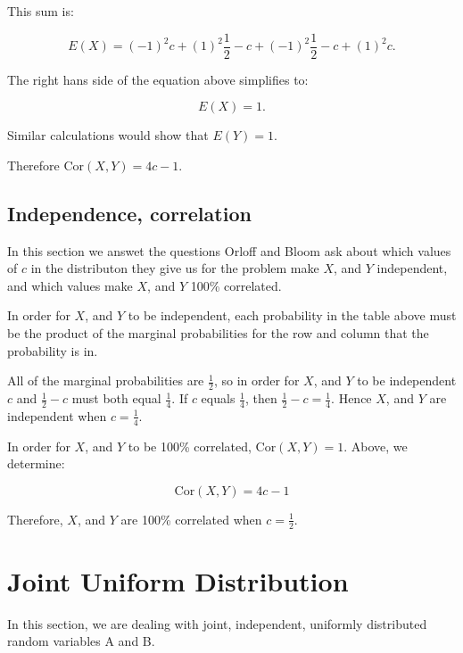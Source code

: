 \documentclass[a5paper,11pt]{article}
\begin{document}
This sum is:

\begin{equation}
E\left(X\right) =
\left(-1\right)^2 c +
\left(1\right)^2 \frac{1}{2} - c+
\left(-1\right)^2 \frac{1}{2} - c+
\left(1\right)^2 c. 
\end{equation} 

The right hans side of the equation above
simplifies to:

\begin{equation}
E\left(X\right) = 1.
\end{equation} 

Similar calculations would show that
$E\left(Y\right)=1$.

Therefore Cor$\left(X,Y\right) = 4c-1$.

\subsection{Independence, correlation}

In this section we answet the questions
Orloff and Bloom ask about which values
of $c$ in the distributon they give
us for the problem make $X$, and
$Y$ independent, and which values
make $X$, and $Y$ 100\% correlated.

In order for $X$, and $Y$ to be 
independent, each probability in the
table above must be the product of the 
marginal probabilities for the row
and column that the probability is in.

All of the marginal probabilities are
$\frac{1}{2}$, so in order for $X$, and
$Y$ to be independent $c$  and $\frac{1}{2}
-c$ must both equal $\frac{1}{4}$. If $c$
equals $\frac{1}{4}$, then $\frac{1}{2} - c
= \frac{1}{4}$. Hence $X$, and $Y$ are 
independent when $c=\frac{1}{4}$.

In order for $X$, and $Y$ to be 100\%
correlated, Cor$\left(X,Y\right) = 1$.
Above, we determine: 

\begin{equation}
\text{Cor}\left(X,Y\right) = 4c -1
\end{equation}

Therefore, $X$, and $Y$ are 100\% 
correlated when $c=\frac{1}{2}$.

\section{Joint Uniform Distribution}

In this section, we are dealing
with joint, independent, uniformly
distributed random variables A and B. 
\end{document}
